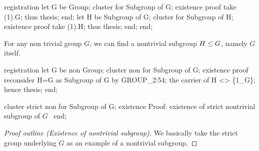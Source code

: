 \nwenddocs{}\endmoddef\nwstartdeflinemarkup{}\nwenddeflinemarkup
registration
  let G be Group;
  cluster  for Subgroup of G;
  existence
  proof
    take (1).G;
    thus thesis;
  end;
  let H be Subgroup of G;
  cluster  for Subgroup of H;
  existence
  proof
    take (1).H;
    thus thesis;
  end;
end;
\eatline
{}\nwendcode{}\nwdocspar
\begin{registration}
For any non trivial group $G$, we can find a nontrivial subgroup
$H\leq G$, namely $G$ itself.
\end{registration}

\nwenddocs{}\endmoddef\nwstartdeflinemarkup{}\nwenddeflinemarkup
registration
  let G be non  Group;
  cluster non  for Subgroup of G;
  existence
  proof
    reconsider H=G as Subgroup of G by GROUP_2:54;
    the carrier of H <> \{1_G\};
    hence thesis;
  end;

  cluster strict non  for Subgroup of G;
  existence
  \LA{}Proof: existence of strict nontrivial subgroup of $G$~{\nwtagstyle{}}\RA{}
end;
\nwendcode{}\nwdocspar


\begin{proof}[Proof outline (Existence of nontrivial subgroup)]
We basically take the strict group underlying $G$ as an example of a
nontrivial subgroup.
\end{proof}


